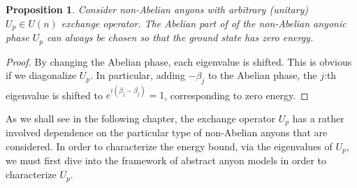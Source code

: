 \documentclass[a4paper,10pt,oneside]{book}
\theoremstyle{plain}
\newtheorem{proposition}[theorem]{Proposition}
\theoremstyle{definition}
\theoremstyle{remark}
\begin{document}
\begin{proposition}
  Consider non-Abelian anyons with arbitrary (unitary) $U_p \in U(n)$ exchange operator. The Abelian part of of the non-Abelian anyonic phase $U_p$ can always be chosen so that the ground state has zero energy.
\end{proposition}

\begin{proof}
  By changing the Abelian phase, each eigenvalue is shifted. This is obvious if we diagonalize $U_p$. In particular, adding $-\beta_j$ to the Abelian phase, the $j$:th eigenvalue is shifted to $e^{i(\beta_j-\beta_j)} = 1$, corresponding to zero energy.
\end{proof}



As we shall see in the following chapter, the exchange operator $U_p$ has a rather involved dependence on the particular type of non-Abelian anyons that are considered. In order to characterize the energy bound, via the eigenvalues of $U_p$, we must first dive into the framework of abstract anyon models in order to characterize $U_p$.
\end{document}
